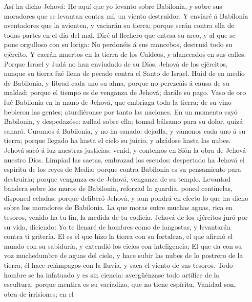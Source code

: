  Así ha dicho Jehová: He aquí que yo levanto sobre
Babilonia, y sobre sus moradores que se levantan contra mí, un viento
destruidor.  Y enviaré á Babilonia aventadores que la
avienten, y vaciarán su tierra; porque serán contra ella de todas partes
en el día del mal.  Diré al flechero que entesa su arco, y
al que se pone orgulloso con su loriga: No perdonéis á sus mancebos,
destruid todo su ejército.  Y caerán muertos en la tierra de
los Caldeos, y alanceados en sus calles.  Porque Israel y
Judá no han enviudado de su Dios, Jehová de los ejércitos, aunque su
tierra fué llena de pecado contra el Santo de Israel.  Huid
de en medio de Babilonia, y librad cada uno su alma, porque no perezcáis
á causa de su maldad: porque el tiempo es de venganza de Jehová; darále
su pago.  Vaso de oro fué Babilonia en la mano de Jehová,
que embriaga toda la tierra: de su vino bebieron las gentes;
aturdiéronse por tanto las naciones.  En un momento cayó
Babilonia, y despedazóse: aullad sobre ella; tomad bálsamo para su
dolor, quizá sanará.  Curamos á Babilonia, y no ha sanado:
dejadla, y vámonos cada uno á su tierra; porque llegado ha hasta el
cielo su juicio, y alzádose hasta las nubes.  Jehová sacó á
luz nuestras justicias: venid, y contemos en Sión la obra de Jehová
nuestro Dios.  Limpiad las saetas, embrazad los escudos:
despertado ha Jehová el espíritu de los reyes de Media; porque contra
Babilonia es su pensamiento para destruirla; porque venganza es de
Jehová, venganza de su templo.  Levantad bandera sobre los
muros de Babilonia, reforzad la guardia, poned centinelas, disponed
celadas; porque deliberó Jehová, y aun pondrá en efecto lo que ha dicho
sobre los moradores de Babilonia.  La que moras entre
muchas aguas, rica en tesoros, venido ha tu fin, la medida de tu
codicia.  Jehová de los ejércitos juró por su vida,
diciendo: Yo te llenaré de hombres como de langostas, y levantarán
contra ti gritería.  El es el que hizo la tierra con su
fortaleza, el que afirmó el mundo con su sabiduría, y extendió los
cielos con inteligencia;  El que da con su voz muchedumbre
de aguas del cielo, y hace subir las nubes de lo postrero de la tierra;
él hace relámpagos con la lluvia, y saca el viento de sus tesoros.
 Todo hombre se ha infatuado y es sin ciencia: avergüénzase
todo artífice de la escultura, porque mentira es su vaciadizo, que no
tiene espíritu.  Vanidad son, obra de irrisiones; en el
